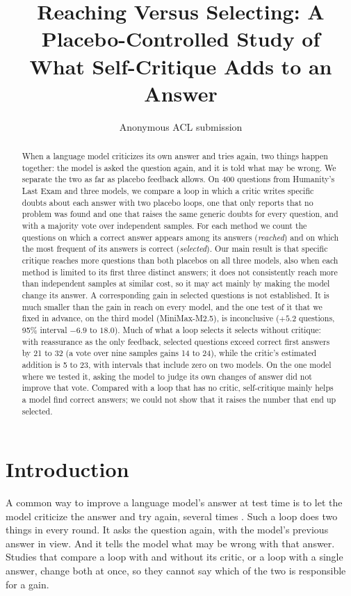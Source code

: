\documentclass[11pt]{article}
\title{Reaching Versus Selecting: A Placebo-Controlled Study of\\What Self-Critique Adds to an Answer}
\author{Anonymous ACL submission}
\begin{document}
\maketitle

\begin{abstract}
When a language model criticizes its own answer and tries again, two things happen together: the model is asked the question again, and it is told what may be wrong.
We separate the two as far as placebo feedback allows.
On 400 questions from Humanity's Last Exam and three models, we compare a loop in which a critic writes specific doubts about each answer with two placebo loops, one that only reports that no problem was found and one that raises the same generic doubts for every question, and with a majority vote over independent samples.
For each method we count the questions on which a correct answer appears among its answers (\emph{reached}) and on which the most frequent of its answers is correct (\emph{selected}).
Our main result is that specific critique reaches more questions than both placebos on all three models, also when each method is limited to its first three distinct answers; it does not consistently reach more than independent samples at similar cost, so it may act mainly by making the model change its answer.
A corresponding gain in selected questions is not established.
It is much smaller than the gain in reach on every model, and the one test of it that we fixed in advance, on the third model (MiniMax-M2.5), is inconclusive ($+5.2$ questions, 95\% interval $-6.9$ to $18.0$).
Much of what a loop selects it selects without critique: with reassurance as the only feedback, selected questions exceed correct first answers by 21 to 32 (a vote over nine samples gains 14 to 24), while the critic's estimated addition is 5 to 23, with intervals that include zero on two models.
On the one model where we tested it, asking the model to judge its own changes of answer did not improve that vote.
Compared with a loop that has no critic, self-critique mainly helps a model find correct answers; we could not show that it raises the number that end up selected.
\end{abstract}

\section{Introduction}

A common way to improve a language model's answer at test time is to let the model criticize the answer and try again, several times \citep{madaan2023selfrefine,shinn2023reflexion}.
Such a loop does two things in every round.
It asks the question again, with the model's previous answer in view.
And it tells the model what may be wrong with that answer.
Studies that compare a loop with and without its critic, or a loop with a single answer, change both at once, so they cannot say which of the two is responsible for a gain.
\end{document}
